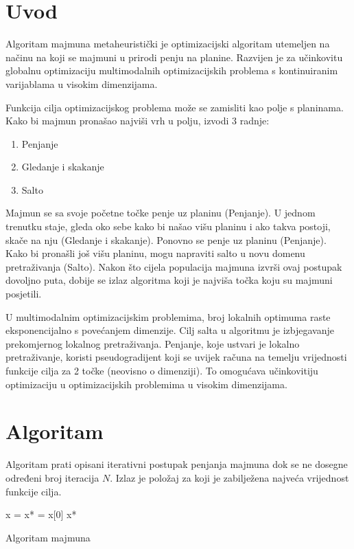 
\section{Uvod}
Algoritam majmuna \cite{ZHAOMA}  metaheuristički je optimizacijski algoritam utemeljen na načinu na koji se majmuni u prirodi penju na planine. Razvijen je za učinkovitu globalnu optimizaciju multimodalnih optimizacijskih problema  s kontinuiranim varijablama u visokim dimenzijama. 
\par
Funkcija cilja optimizacijskog problema može se zamisliti kao polje s planinama. Kako bi majmun pronašao najviši vrh u polju, izvodi 3 radnje:
\begin{enumerate}
	\item Penjanje 
	
	\item Gledanje i skakanje
	
	\item Salto
\end{enumerate}

Majmun se sa svoje početne točke penje uz planinu (Penjanje). U jednom trenutku staje, gleda oko sebe kako bi našao višu planinu i ako takva postoji, skače na nju (Gledanje i skakanje). Ponovno se penje uz planinu (Penjanje). Kako bi pronašli još višu planinu, mogu napraviti salto u novu domenu pretraživanja (Salto). Nakon što cijela populacija majmuna izvrši ovaj postupak dovoljno puta, dobije se izlaz algoritma koji je najviša točka koju su majmuni posjetili.

\par

U multimodalnim optimizacijskim problemima, broj lokalnih optimuma raste eksponencijalno s povećanjem dimenzije. Cilj salta u algoritmu je izbjegavanje prekomjernog lokalnog pretraživanja. Penjanje, koje ustvari je lokalno pretraživanje, koristi pseudogradijent koji se uvijek računa na temelju vrijednosti funkcije cilja za 2 točke (neovisno o dimenziji). To omogućava učinkovitiju optimizaciju u optimizacijskih problemima u visokim dimenzijama.

\section{Algoritam}
Algoritam prati opisani iterativni postupak penjanja majmuna dok se ne dosegne određeni broj iteracija $N$. Izlaz je položaj za koji je zabilježena najveća vrijednost funkcije cilja.

\begin{algorithm}
	\begin{algorithmic}[1]
		\State x = 
		\State x* = x[0] 
		\State {}
		\State {}
		\State {}
		\State {}
		\EndFor
		\State
		\Return x*
		\EndFunction
	\end{algorithmic}
	\caption{Algoritam majmuna}
\end{algorithm}



